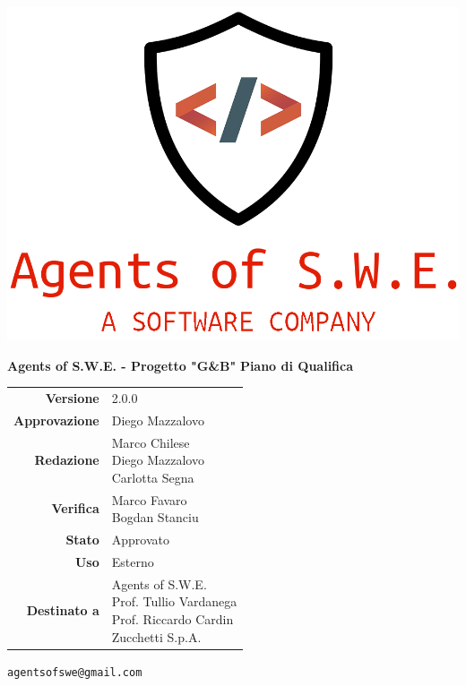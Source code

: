 

\usepackage{float}


\begin{titlepage}
\thispagestyle{empty}

\begin{center}

\includegraphics[scale=0.3]{./images/logo.png} 

\large \textbf{Agents of S.W.E. - Progetto "G\&B"}
\vfill
\Huge \textbf{Piano di Qualifica}
\vfill
\large
\renewcommand{\arraystretch}{1.3}
\begin{tabular}{r|l}
\textbf{Versione} & 2.0.0\\
\textbf{Approvazione} & Diego Mazzalovo\\
\textbf{Redazione} & \parbox[t]{5cm}{Marco Chilese\\Diego Mazzalovo\\Carlotta Segna}\\
\textbf{Verifica} & \parbox[t]{5cm}{Marco Favaro\\Bogdan Stanciu}\\
\textbf{Stato} & Approvato\\
\textbf{Uso} & Esterno\\
\textbf{Destinato a} & \parbox[t]{5cm}{Agents of S.W.E. \\Prof. Tullio Vardanega\\Prof. Riccardo Cardin\\Zucchetti S.p.A.}
\end{tabular}
\vfill
\small
\texttt{agentsofswe@gmail.com}
\end{center}
\end{titlepage}

